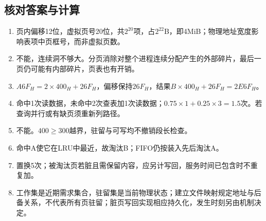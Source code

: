 \subsection{核对答案与计算}\label{OS03-recall-answers}

\begin{enumerate}
\def\labelenumi{\arabic{enumi}.}
\tightlist
\item
  页内偏移12位，虚拟页号20位，共\(2^{20}\)项，占\(2^{22}\)B，即4MiB；物理地址宽度影响表项中页框号，而非虚拟页数。
\item
  不能，连续洞不够大。分页消除对整个进程连续分配产生的外部碎片，最后一页仍可能有内部碎片，页表也有开销。
\item
  \(A6F_H=2\times400_H+26F_H\)，偏移保持\(26F_H\)，结果\(B\times400_H+26F_H=2E6F_H\)。
\item
  命中1次读数据，未命中2次查表加1次读数据；\(0.75\times1+0.25\times3=1.5\)次。若查询并行或有缺页须重新列路径。
\item
  不能。\(400\ge300\)越界，驻留与可写均不撤销段长检查。
\item
  命中A使它在LRU中最近，故淘汰B；FIFO仍按装入先后淘汰A。
\item
  置换5次；被淘汰页若脏且需保留内容，应另计写回，服务时间已包含时不重复加。
\item
  工作集是近期需求集合，驻留集是当前物理状态；建立文件映射规定地址与后备关系，不代表所有页驻留；脏页写回实现相应持久化，发生时刻另由机制决定。
\end{enumerate}
